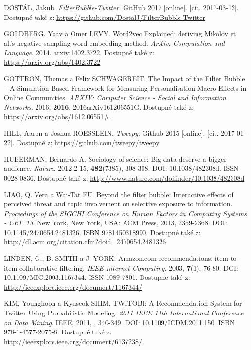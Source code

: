 \documentclass[12pt, a4paper]{article}
\numberwithin{equation}{section} 	%
\begin{document}
\begin{thebibliography}{99}
    DOSTÁL, Jakub. \textit{FilterBubble-Twitter}. GitHub 2017 [online]. [cit. 2017-03-12]. Dostupné také z: \url{https://github.com/DostalJ/FilterBubble-Twitter}

    GOLDBERG, Yoav a Omer LEVY. Word2vec Explained: deriving Mikolov et al.'s negative-sampling word-embedding method. \textit{ArXiv: Computation and Language}. 2014. arxiv:1402.3722. Dostupné také z: \url{https://arxiv.org/abs/1402.3722}

    GOTTRON, Thomas a Felix SCHWAGEREIT. The Impact of the Filter Bubble -- A Simulation Based Framework for Measuring Personalisation Macro Effects in Online Communities. \textit{ARXIV: Computer Science - Social and Information Networks}. 2016, \textbf{2016}. 2016arXiv161206551G. Dostupné také z: \url{https://arxiv.org/abs/1612.06551\#}

    HILL, Aaron a Joshua ROESSLEIN. \textit{Tweepy}. Github 2015 [online]. [cit. 2017-01-22]. Dostupné z: \url{https://github.com/tweepy/tweepy}

    HUBERMAN, Bernardo A. Sociology of science: Big data deserve a bigger audience. \textit{Nature}. 2012-2-15, \textbf{482}(7385), 308-308. DOI: 10.1038/482308d. ISSN 0028-0836. Dostupné také z: \url{http://www.nature.com/doifinder/10.1038/482308d}

    LIAO, Q. Vera a Wai-Tat FU. Beyond the filter bubble: Interactive effects of perceived threat and topic involvement on selective exposure to information. \textit{Proceedings of the SIGCHI Conference on Human Factors in Computing Systems - CHI '13}. New York, New York, USA: ACM Press, 2013, 2359-2368. DOI: 10.1145/2470654.2481326. ISBN 9781450318990. Dostupné také z: \url{http://dl.acm.org/citation.cfm?doid=2470654.2481326}

    LINDEN, G., B. SMITH a J. YORK. Amazon.com recommendations: item-to-item collaborative filtering. \textit{IEEE Internet Computing}. 2003, \textbf{7}(1), 76-80. DOI: 10.1109/MIC.2003.1167344. ISSN 1089-7801. Dostupné také z: \url{http://ieeexplore.ieee.org/document/1167344/}

    KIM, Younghoon a Kyuseok SHIM. TWITOBI: A Recommendation System for Twitter Using Probabilistic Modeling. \textit{2011 IEEE 11th International Conference on Data Mining}. IEEE, 2011, , 340-349. DOI: 10.1109/ICDM.2011.150. ISBN 978-1-4577-2075-8. Dostupné také z: \url{http://ieeexplore.ieee.org/document/6137238/}


\end{thebibliography}
\end{document}
